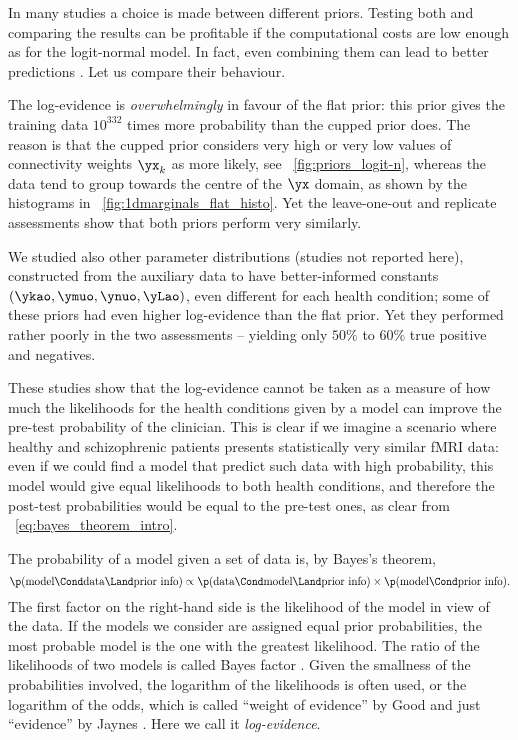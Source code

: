 In many studies a choice is made between different priors. Testing both and
comparing the results can be profitable if the computational costs are low
enough as for the logit-normal model. In fact, even combining them can lead
to better predictions \citep{hoetingetal1999}. Let us compare their
behaviour.

The log-evidence is \emph{overwhelmingly} in favour of the flat prior: this
prior gives the training data $10^{332}$ times more probability than the
cupped prior does. The reason is that the cupped prior considers very high
or very low values of connectivity weights $\yx_k$ as more likely, see
\fig~\ref{fig:priors_logit-n}, whereas the data tend to group towards the
centre of the $\yx$ domain, as shown by the histograms in
\fig~\ref{fig:1dmarginals_flat_histo}. Yet the leave-one-out and replicate
assessments show that both priors perform very similarly.

We studied also other parameter distributions (studies not reported here),
constructed from the auxiliary data to have better-informed constants
$(\ykao,\ymuo,\ynuo,\yLao)$, even different for each health condition; some
of these priors had even higher log-evidence than the flat prior. Yet they
performed rather poorly in the two assessments -- yielding only
$50\%$ to $60\%$ true positive and negatives.

These studies show that the log-evidence cannot be taken as a measure of
how much the likelihoods for the health conditions given by a model can
improve the pre-test probability of the clinician. This is clear if we
imagine a scenario where healthy and schizophrenic patients presents
statistically very similar fMRI data: even if we could find a model that
predict such data with high probability, this model would give equal
likelihoods to both health conditions, and therefore the post-test
probabilities would be equal to the pre-test ones, as clear from
\eqn~\eqref{eq:bayes_theorem_intro}.


The probability of a model given a set of data is, by Bayes's theorem,
\begin{equation}
  \label{eq:probability_model}
  \p(\text{model} \Cond \text{data} \Land \text{prior info}) \propto
  \p(\text{data} \Cond \text{model} \Land \text{prior info}) \times
  \p(\text{model} \Cond  \text{prior info}). 
\end{equation}
The first factor on the right-hand side is the likelihood of the model in
view of the data. If the models we consider are assigned equal prior
probabilities, the most probable model is the one with the greatest
likelihood. The ratio of the likelihoods of two models is called Bayes
factor \citetext{\citealp[\chaps~V, VI, A]{jeffreys1939_r2003};
  \citealp{good1950,mackay1992}. For historical references besides
  \citealp{jeffreys1935,jeffreys1936} see \citealp[\chaps~14, 15]{good1983}
  and references therein}. Given the smallness of the probabilities
involved, the logarithm of the likelihoods is often used, or the logarithm
of the odds, which is called \enquote{weight of evidence} by Good
 and just \enquote{evidence} by Jaynes
. Here we call it \emph{log-evidence}.


